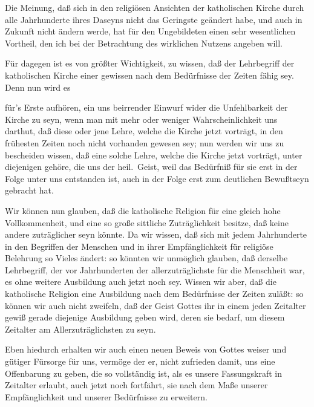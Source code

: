 \begin{aufza}
\item Die Meinung, daß sich in den religiösen Ansichten der katholischen Kirche durch alle Jahrhunderte ihres Daseyns nicht das Geringste geändert habe, und auch in Zukunft nicht ändern werde, hat für den Ungebildeten einen sehr wesentlichen Vortheil, den ich bei der Betrachtung des wirklichen Nutzens angeben will.~
\item Für  dagegen ist es von größter Wichtigkeit, zu wissen, daß der Lehrbegriff der katholischen Kirche einer gewissen  nach dem Bedürfnisse der Zeiten fähig sey. Denn nun wird es
\begin{aufzb}
\item für's Erste aufhören, ein uns beirrender Einwurf wider die Unfehlbarkeit der Kirche zu seyn, wenn man mit mehr oder weniger Wahrscheinlichkeit uns darthut, daß diese oder jene Lehre, welche die Kirche jetzt vorträgt, in den frühesten Zeiten noch nicht vorhanden gewesen sey; nun werden wir uns zu bescheiden wissen, daß eine solche Lehre, welche die Kirche jetzt vorträgt, unter diejenigen gehöre, die uns der heil.\ Geist, weil das Bedürfniß für sie erst in der Folge unter uns entstanden ist, auch in der Folge erst zum deutlichen Bewußtseyn gebracht hat.
\item Wir können nun glauben, daß die katholische Religion für  eine gleich hohe Vollkommenheit, und eine so große sittliche Zuträglichkeit besitze, daß keine andere zuträglicher seyn könnte. Da wir wissen, daß sich mit jedem Jahrhunderte in den Begriffen der Menschen und in ihrer Empfänglichkeit für religiöse Belehrung so Vieles ändert: so könnten wir unmöglich glauben, daß derselbe Lehrbegriff, der vor Jahrhunderten der allerzuträglichste für die Menschheit war, es ohne weitere Ausbildung auch jetzt noch sey. Wissen wir aber, daß die katholische Religion eine Ausbildung nach dem Bedürfnisse der Zeiten zuläßt: so können wir auch nicht zweifeln, daß der Geist Gottes ihr in einem jeden Zeitalter gewiß gerade diejenige Ausbildung geben wird, deren sie bedarf, um diesem Zeitalter am Allerzuträglichsten zu seyn.
\item Eben hiedurch erhalten wir auch einen neuen Beweis von Gottes weiser und gütiger Fürsorge für uns, vermöge der er, nicht zufrieden damit, uns eine Offenbarung zu geben, die so vollständig ist, als es unsere Fassungskraft in  Zeitalter erlaubt, auch jetzt noch fortfährt, sie nach dem Maße unserer Empfänglichkeit und unserer Bedürfnisse zu erweitern.

\end{aufzb}
\end{aufza}
